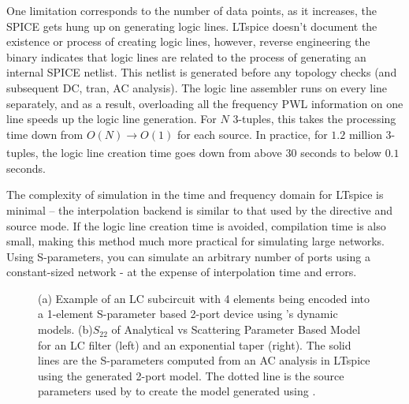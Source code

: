 One limitation corresponds to the number of data points, as it increases, the SPICE
gets hung up on generating logic lines. LTspice doesn't document the existence or process
of creating logic lines, however, reverse engineering the binary indicates that logic lines
are related to the process of generating an internal SPICE netlist. This netlist is generated
before any topology checks (and subsequent DC, tran, AC analysis). The logic line assembler runs
on every line separately, and as a result, overloading all the frequency PWL information on
one line speeds up the logic line generation. For $N$ 3-tuples, this takes the processing time
down from $O(N)\xrightarrow[]{} O(1)$ for each source. In practice, for $1.2$ million 3-tuples,
the logic line creation time goes down from above $30$ seconds to below $0.1$ seconds.

The complexity of simulation in the time and frequency domain for LTspice is minimal -- the 
interpolation backend is similar to that used by the  directive and  source mode.
If the logic line creation time is avoided, compilation time is also small, making this method
much more practical for simulating large networks. Using S-parameters, you can simulate an arbitrary
number of ports using a constant-sized network - at the expense of interpolation time and errors. 

\begin{figure}
    \centering

    
    \caption{(a) Example of an LC subcircuit with 4 elements being encoded into a 1-element
    S-parameter based 2-port device using 's dynamic models.
    (b)$S_{22}$ of Analytical vs Scattering Parameter Based Model
    for an LC filter (left) and an exponential taper (right). The solid lines are the S-parameters
    computed from an AC analysis in LTspice using the  generated 2-port model. The 
    dotted line is the source parameters used by  to create the model generated
    using .}
\end{figure}

